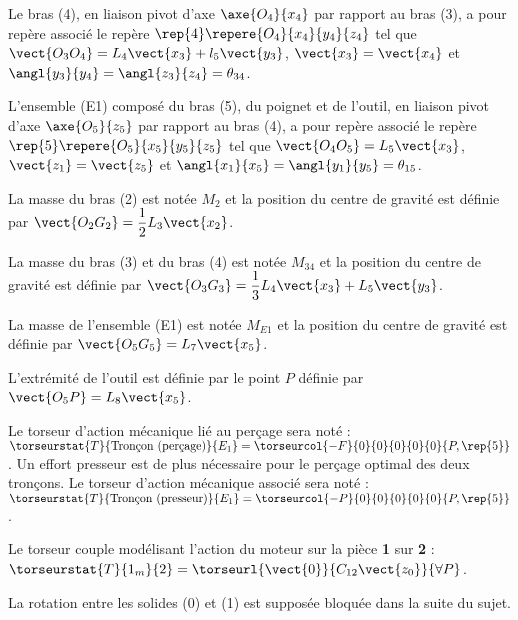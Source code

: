 Le bras (4), en liaison pivot d'axe $\axe{O_4}{x_4}$ par rapport au bras (3), a pour repère
associé le repère $\rep{4}\repere{O_4}{x_4}{y_4}{z_4}$ tel que $\vect{O_3 O_4} = L_4\vect{x_3} +l_5 \vect{y_3}$, $\vect{x_3}=\vect{x_4}$ et $\angl{y_3}{y_4}=\angl{z_3}{z_4}=\theta_{34}$.

L'ensemble (E1) composé du bras (5), du poignet et de l'outil, en liaison pivot d'axe $\axe{O_5}{z_5}$ par
rapport au bras (4), a pour repère associé le repère $\rep{5}\repere{O_5}{x_5}{y_5}{z_5}$ tel que $\vect{O_4O_5}=L_5\vect{x_3}$, $\vect{z_1}=\vect{z_5}$ et $\angl{x_1}{x_5}=\angl{y_1}{y_5}=\theta_{15}$.


La masse du bras (2) est notée $M_2$ et la position du centre de gravité est définie par $\vect{O_2G_2}=\dfrac{1}{2}L_3\vect{x_2}$.


La masse du bras (3) et du bras (4) est notée $M_{34}$ et la position du centre de gravité est définie par
$\vect{O_3G_3}=\dfrac{1}{3}L_4\vect{x_3}+L_5\vect{y_3}$.

La masse de l'ensemble (E1) est notée $M_{E1}$ et la position du centre de gravité est définie par
$\vect{O_5G_5}=L_7\vect{x_5}$. 

L’extrémité de l’outil est définie par le point $P$ définie par $\vect{O_5P}=L_8\vect{x_5}$. 

Le torseur d’action mécanique lié au perçage sera noté : $\torseurstat{T}{\text{Tronçon (perçage)}}{E_1}=\torseurcol{-F}{0}{0}{0}{0}{0}{P, \rep{5}}$.
Un effort presseur est de plus nécessaire pour le perçage optimal des deux tronçons. Le torseur
d’action mécanique associé sera noté :$\torseurstat{T}{\text{Tronçon (presseur)}}{E_1}=\torseurcol{-P}{0}{0}{0}{0}{0}{P, \rep{5}}$.

Le torseur couple modélisant l'action du moteur sur la pièce \textbf{1} sur \textbf{2} : $\torseurstat{T}{1_m}{2}=\torseurl{\vect{0}}{C_{12}\vect{z_0}}{\forall P}$.


La rotation entre les solides (0) et (1) est supposée bloquée dans la suite du sujet.


\fi

\ifprof
\else
\fi

\ifprof
\else
\fi

\ifprof
\else
\fi

